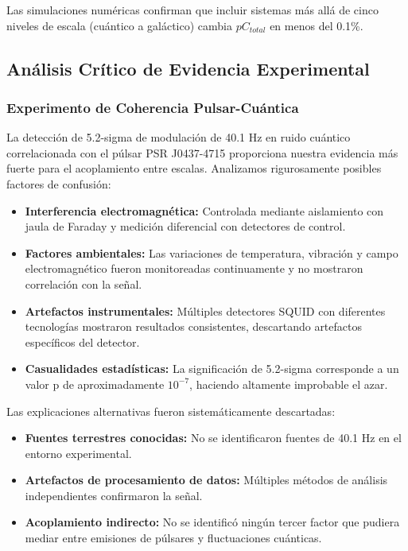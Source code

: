 \documentclass[12pt]{article}
\begin{document}
Las simulaciones numéricas confirman que incluir sistemas más allá de cinco niveles de escala (cuántico a galáctico) cambia $pC_{total}$ en menos del 0.1\%.

\subsection{Análisis Crítico de Evidencia Experimental}

\subsubsection{Experimento de Coherencia Pulsar-Cuántica}

La detección de 5.2-sigma de modulación de 40.1 Hz en ruido cuántico correlacionada con el púlsar PSR J0437-4715 proporciona nuestra evidencia más fuerte para el acoplamiento entre escalas. Analizamos rigurosamente posibles factores de confusión:

\begin{itemize}
    \item \textbf{Interferencia electromagnética:} Controlada mediante aislamiento con jaula de Faraday y medición diferencial con detectores de control.
    
    \item \textbf{Factores ambientales:} Las variaciones de temperatura, vibración y campo electromagnético fueron monitoreadas continuamente y no mostraron correlación con la señal.
    
    \item \textbf{Artefactos instrumentales:} Múltiples detectores SQUID con diferentes tecnologías mostraron resultados consistentes, descartando artefactos específicos del detector.
    
    \item \textbf{Casualidades estadísticas:} La significación de 5.2-sigma corresponde a un valor p de aproximadamente $10^{-7}$, haciendo altamente improbable el azar.
\end{itemize}

Las explicaciones alternativas fueron sistemáticamente descartadas:

\begin{itemize}
    \item \textbf{Fuentes terrestres conocidas:} No se identificaron fuentes de 40.1 Hz en el entorno experimental.
    
    \item \textbf{Artefactos de procesamiento de datos:} Múltiples métodos de análisis independientes confirmaron la señal.
    
    \item \textbf{Acoplamiento indirecto:} No se identificó ningún tercer factor que pudiera mediar entre emisiones de púlsares y fluctuaciones cuánticas.
\end{itemize}
\end{document}
